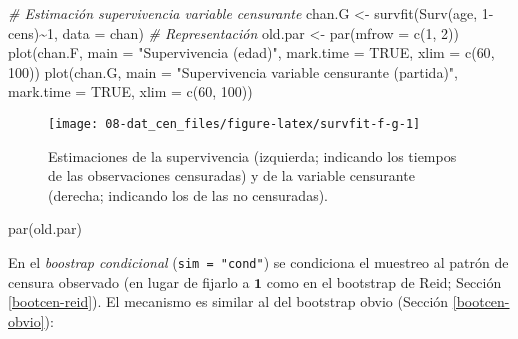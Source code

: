 \documentclass[
]{book}
\newenvironment{Shaded}{\begin{snugshade}}{\end{snugshade}}
\newcommand{\AttributeTok}[1]{\textcolor[rgb]{0.77,0.63,0.00}{#1}}
\newcommand{\CommentTok}[1]{\textcolor[rgb]{0.56,0.35,0.01}{\textit{#1}}}
\newcommand{\ConstantTok}[1]{\textcolor[rgb]{0.00,0.00,0.00}{#1}}
\newcommand{\DecValTok}[1]{\textcolor[rgb]{0.00,0.00,0.81}{#1}}
\newcommand{\FunctionTok}[1]{\textcolor[rgb]{0.00,0.00,0.00}{#1}}
\newcommand{\NormalTok}[1]{#1}
\newcommand{\OtherTok}[1]{\textcolor[rgb]{0.56,0.35,0.01}{#1}}
\newcommand{\SpecialCharTok}[1]{\textcolor[rgb]{0.00,0.00,0.00}{#1}}
\newcommand{\StringTok}[1]{\textcolor[rgb]{0.31,0.60,0.02}{#1}}
\theoremstyle{break}
\theoremstyle{definition}
\theoremstyle{definition}
\theoremstyle{definition}
\theoremstyle{definition}
\theoremstyle{remark}
\begin{document}
\begin{Shaded}
\begin{Highlighting}[]
\CommentTok{\# Estimación supervivencia variable censurante}
\NormalTok{chan.G }\OtherTok{\textless{}{-}} \FunctionTok{survfit}\NormalTok{(}\FunctionTok{Surv}\NormalTok{(age, }\DecValTok{1}\SpecialCharTok{{-}}\NormalTok{cens)}\SpecialCharTok{\textasciitilde{}}\DecValTok{1}\NormalTok{, }\AttributeTok{data =}\NormalTok{ chan)}
\CommentTok{\# Representación}
\NormalTok{old.par }\OtherTok{\textless{}{-}} \FunctionTok{par}\NormalTok{(}\AttributeTok{mfrow =} \FunctionTok{c}\NormalTok{(}\DecValTok{1}\NormalTok{, }\DecValTok{2}\NormalTok{))}
\FunctionTok{plot}\NormalTok{(chan.F, }\AttributeTok{main =} \StringTok{"Supervivencia (edad)"}\NormalTok{, }\AttributeTok{mark.time =} \ConstantTok{TRUE}\NormalTok{, }
    \AttributeTok{xlim =} \FunctionTok{c}\NormalTok{(}\DecValTok{60}\NormalTok{, }\DecValTok{100}\NormalTok{))}
\FunctionTok{plot}\NormalTok{(chan.G, }\AttributeTok{main =} \StringTok{"Supervivencia variable censurante (partida)"}\NormalTok{, }
     \AttributeTok{mark.time =} \ConstantTok{TRUE}\NormalTok{, }\AttributeTok{xlim =} \FunctionTok{c}\NormalTok{(}\DecValTok{60}\NormalTok{, }\DecValTok{100}\NormalTok{))}
\end{Highlighting}
\end{Shaded}

\begin{figure}[!htb]

{\centering \texttt{[image: 08-dat\_cen\_files/figure-latex/survfit-f-g-1]} 

}

\caption{Estimaciones de la supervivencia (izquierda; indicando los tiempos de las observaciones censuradas) y de la variable censurante (derecha; indicando los de las no censuradas).}\label{fig:survfit-f-g}
\end{figure}

\begin{Shaded}
\begin{Highlighting}[]
\FunctionTok{par}\NormalTok{(old.par)}
\end{Highlighting}
\end{Shaded}

En el \emph{boostrap condicional} (\texttt{sim\ =\ "cond"}) se condiciona el muestreo al
patrón de censura observado (en lugar de fijarlo a \(\mathbf{1}\) como en el bootstrap de Reid; Sección \ref{bootcen-reid}).
El mecanismo es similar al del bootstrap obvio (Sección \ref{bootcen-obvio}):
\end{document}
